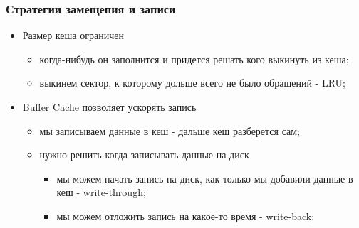 \begin{frame}
\frametitle{Стратегии замещения и записи}
\begin{itemize}
  \item<1-> Размер кеша ограничен
    \begin{itemize}
      \item когда-нибудь он заполнится и придется решать кого выкинуть из кеша;
      \item выкинем сектор, к которому дольше всего не было обращений - LRU;
    \end{itemize}
  \item<2-> Buffer Cache позволяет ускорять запись
    \begin{itemize}
      \item мы записываем данные в кеш - дальше кеш разберется сам;
      \item нужно решить когда записывать данные на диск
        \begin{itemize}
          \item мы можем начать запись на диск, как только мы добавили данные в
                кеш - write-through;
          \item мы можем отложить запись на какое-то время - write-back;
        \end{itemize}
    \end{itemize}
\end{itemize}
\end{frame}


